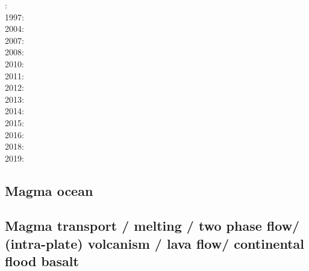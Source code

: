 : \cite{dagu86}\\
1997: \cite{kell97}\\
2004: \cite{mczh04}\\
2007: \cite{heta07}\\
2008: \cite{gamc08}\\
2010: \cite{stto10}\\
2011: \cite{bowg11}\cite{talz11}\\
2012: \cite{stto12}\cite{dagd12}\cite{dect12}\\
2013: \cite{limc13}\cite{bogs13a}\\
2014: \cite{budt14}\cite{lidt14}\cite{tovd14}\\
2015: \cite{musd15}\cite{hafg15}\cite{mczh05a}\cite{delt15}\\
2016: \cite{dost16}\cite{tosa16}\\
2018: \cite{daga18}\cite{lizo18}\cite{hect18}\\
2019: \cite{hebo19}


\subsection*{Magma ocean}

\cite{maha15}



\subsection*{Magma transport / melting / two phase flow/ (intra-plate) volcanism / lava flow/ 
continental flood basalt}

